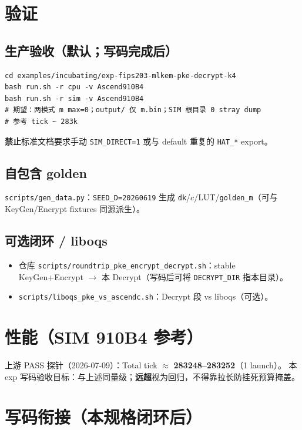 \documentclass[UTF8,a4paper,11pt]{ctexart}
\begin{document}
\section{验证}
\label{sec:verify}

\subsection{生产验收（默认；写码完成后）}

\begin{verbatim}
cd examples/incubating/exp-fips203-mlkem-pke-decrypt-k4
bash run.sh -r cpu -v Ascend910B4
bash run.sh -r sim -v Ascend910B4
# 期望：两模式 m max=0；output/ 仅 m.bin；SIM 根目录 0 stray dump
# 参考 tick ~ 283k
\end{verbatim}

\textbf{禁止}标准文档要求手动 \texttt{SIM\_DIRECT=1} 或与 default 重复的 \texttt{HAT\_*} export。

\subsection{自包含 golden}

\texttt{scripts/gen\_data.py}：\texttt{SEED\_D=20260619} 生成 \texttt{dk}/$c$/LUT/\texttt{golden\_m}（可与 KeyGen/Encrypt fixtures 同源派生）。

\subsection{可选闭环 / liboqs}

\begin{itemize}
  \item 仓库 \texttt{scripts/roundtrip\_pke\_encrypt\_decrypt.sh}：stable KeyGen+Encrypt $\to$ 本 Decrypt（写码后可将 \texttt{DECRYPT\_DIR} 指本目录）。
  \item \texttt{scripts/liboqs\_pke\_vs\_ascendc.sh}：Decrypt 段 vs liboqs（可选）。
\end{itemize}

\section{性能（SIM 910B4 参考）}

上游 PASS 探针（2026-07-09）：Total tick $\approx$ \textbf{283248--283252}（1 launch）。
本 exp 写码验收目标：与上述同量级；\textbf{远超}视为回归，不得靠拉长防挂死预算掩盖。

\section{写码衔接（本规格闭环后）}
\end{document}
